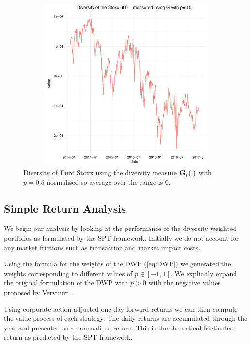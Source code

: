 \documentclass[british]{amsart} \usepackage{lmodern}
\numberwithin{equation}{section} \numberwithin{figure}{section}
\theoremstyle{plain} \newtheorem{thm}{\protect\theoremname}[section]
\theoremstyle{definition} \newtheorem{defn}[thm]{\protect\definitionname}
\theoremstyle{plain} \newtheorem{assumption}[thm]{\protect\assumptionname}
\theoremstyle{plain} \newtheorem{lem}[thm]{\protect\lemmaname}
\theoremstyle{plain} \newtheorem{prop}[thm]{\protect\propositionname}
\theoremstyle{remark} \newtheorem{rem}[thm]{\protect\remarkname}
\theoremstyle{plain} \newtheorem{cor}[thm]{\protect\corollaryname}
\begin{document}
\begin{figure}[!ht]
  \label{fig:figdiversity}
  \caption{Diversity of Euro Stoxx  using the diversity measure $\mathbf{G}_{p}(\cdot)$
  with $p=0.5$ normalised so average over the range is $0$.}
  \includegraphics[width=350pt,height=250pt]{diversity.pdf}
\end{figure}

\newpage
\subsection{Simple Return Analysis}

We begin our analysis by looking at the performance of the diversity weighted
portfolios as formulated by the SPT framework. Initially we do not account for
any market frictions such as transaction and market impact costs.

Using the formula for the weights of the DWP (\ref{eq:DWP}) we generated the
weights corresponding to different values of $p \in [-1,1]$. We explicitly
expand the original formulation of the DWP with $p > 0$ \cite{fernholz2005} with
the negative values proposed by Vervuurt \cite{vervuurt2015}.

Using corporate action adjusted one day forward returns we can then compute the
value process of each strategy. The daily returns are accumulated through the
year and presented as an annualised return. This is the theoretical frictionless
return as predicted by the SPT framework.
\end{document}

